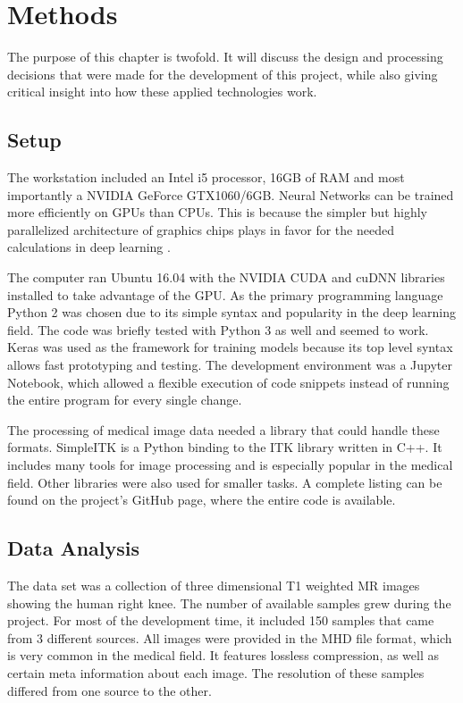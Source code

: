\section{Methods}

The purpose of this chapter is twofold. It will discuss the design and processing decisions that were made for the development of this project, while also giving critical insight into how these applied technologies work.

\subsection{Setup}

The workstation included an Intel i5 processor, 16GB of RAM and most importantly a NVIDIA GeForce GTX1060/6GB. Neural Networks can be trained more efficiently on GPUs than CPUs. This is because the simpler but highly parallelized architecture of graphics chips plays in favor for the needed calculations in deep learning \cite{NVIDIA}.

The computer ran Ubuntu 16.04 with the NVIDIA CUDA and cuDNN libraries installed to take advantage of the GPU. As the primary programming language Python 2 was chosen due to its simple syntax and popularity in the deep learning field. The code was briefly tested with Python 3 as well and seemed to work. Keras was used as the framework for training models because its top level syntax allows fast prototyping and testing. The development environment was a Jupyter Notebook, which allowed a flexible execution of code snippets instead of running the entire program for every single change.

The processing of medical image data needed a library that could handle these formats. SimpleITK is a Python binding to the ITK library written in C++. It includes many tools for image processing and is especially popular in the medical field. Other libraries were also used for smaller tasks. A complete listing can be found on the project's GitHub page, where the entire code is available.

\subsection{Data Analysis}

The data set was a collection of three dimensional T1 weighted MR images showing the human right knee. The number of available samples grew during the project. For most of the development time, it included 150 samples that came from 3 different sources. All images were provided in the MHD file format, which is very common in the medical field. It features lossless compression, as well as certain meta information about each image. The resolution of these samples differed from one source to the other.

